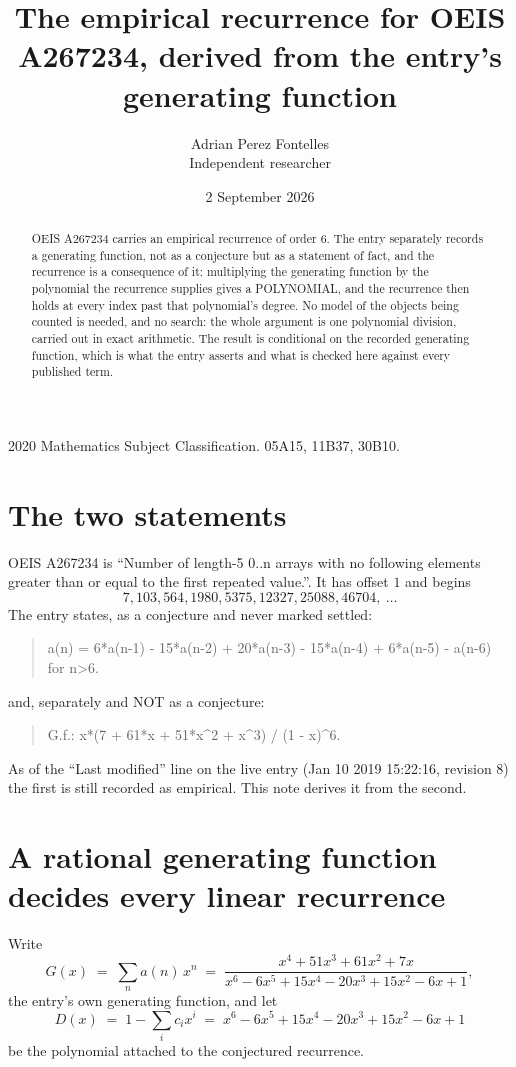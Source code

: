 \documentclass[11pt,a4paper]{article}
\title{The empirical recurrence for OEIS A267234, derived from the entry's generating function}
\author{Adrian Perez Fontelles\\ \small Independent researcher}
\date{2 September 2026}
\theoremstyle{plain}
\theoremstyle{definition}
\begin{document}
\maketitle

\begin{abstract}
OEIS A267234 carries an empirical recurrence of order $6$. The entry separately records a
generating function, not as a conjecture but as a statement of fact, and the recurrence is a
consequence of it: multiplying the generating function by the polynomial the recurrence
supplies gives a POLYNOMIAL, and the recurrence then holds at every index past that
polynomial's degree. No model of the objects being counted is needed, and no search: the
whole argument is one polynomial division, carried out in exact arithmetic. The result is
conditional on the recorded generating function, which is what the entry asserts and what is
checked here against every published term.
\end{abstract}

\noindent\small 2020 Mathematics Subject Classification. 05A15, 11B37, 30B10.\normalsize

\section{The two statements}

OEIS A267234 is ``Number of length-5 0..n arrays with no following elements greater than or equal to the first repeated value.''. It has offset $1$ and begins
\[
7, 103, 564, 1980, 5375, 12327, 25088, 46704,\ \dots
\]
The entry states, as a conjecture and never marked settled:
\begin{quote}
a(n) = 6*a(n-1) - 15*a(n-2) + 20*a(n-3) - 15*a(n-4) + 6*a(n-5) - a(n-6) for n>6.
\end{quote}
and, separately and NOT as a conjecture:
\begin{quote}
G.f.: x*(7 + 61*x + 51*x\^{}2 + x\^{}3) / (1 - x)\^{}6.
\end{quote}
As of the ``Last modified'' line on the live entry (Jan 10 2019 15:22:16, revision 8) the first is still
recorded as empirical. This note derives it from the second.

\section{A rational generating function decides every linear recurrence}

Write
\[
G(x)\;=\;\sum_{n}a(n)\,x^{n}\;=\;\frac{x^{4} + 51 x^{3} + 61 x^{2} + 7 x}{x^{6} - 6 x^{5} + 15 x^{4} - 20 x^{3} + 15 x^{2} - 6 x + 1},
\]
the entry's own generating function, and let
\[
D(x)\;=\;1-\sum_i c_i x^{i}\;=\;x^{6} - 6 x^{5} + 15 x^{4} - 20 x^{3} + 15 x^{2} - 6 x + 1
\]
be the polynomial attached to the conjectured recurrence.
\end{document}
